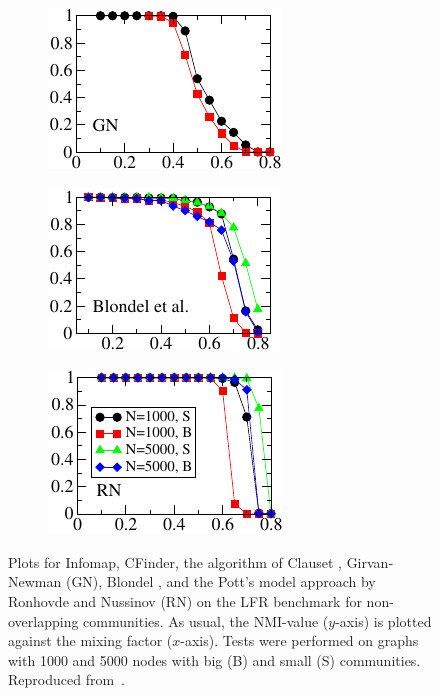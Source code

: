\begin{figure}[h!]
\begin{subfigure}{0.35\textwidth}
    \end{subfigure}
    \begin{subfigure}{0.35\textwidth}
    \centering
    \includegraphics[width=\otherplotswidth]{lfrpaper/4_split_kropped.pdf}
    \end{subfigure}%
    \begin{subfigure}{0.35\textwidth}
    \centering
    \includegraphics[width=\otherplotswidth]{lfrpaper/5_split_kropped.pdf}
    \end{subfigure}%
    \begin{subfigure}{0.35\textwidth}
    \centering
    \includegraphics[width=\otherplotswidth]{lfrpaper/6_split_kropped.pdf}
    \end{subfigure}%
    \caption{
        Plots for Infomap, CFinder, the algorithm of Clauset \etal, Girvan-Newman (GN), Blondel \etal, 
        and the Pott's model approach by Ronhovde and Nussinov (RN) on the LFR benchmark for non-overlapping 
		communities. As usual, the NMI-value ($y$-axis) is plotted against the mixing factor ($x$-axis).
        Tests were performed on graphs with 1000 and 5000 nodes with big (B) and small (S) communities.
        Reproduced from~\cite{LF09}.
    }\label{fig:Infomap_etal}
\end{figure}

